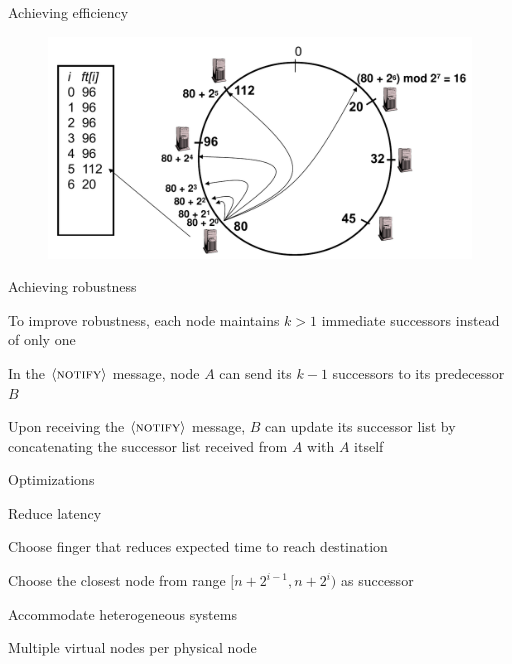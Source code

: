 \begin{frame}{Achieving efficiency}
	
\begin{figure}
	\includegraphics[width=\textwidth]{fingers}
\end{figure}	
	
\end{frame}

\begin{frame}{Achieving robustness}
	
\BI
\item To improve robustness, each node maintains $k > 1$ immediate successors instead of only one
\item In the $\langle \textsc{notify} \rangle$ message, node $A$ can send its $k-1$ successors to its predecessor $B$
\item Upon receiving the $\langle \textsc{notify} \rangle$ message, $B$ can update its successor list 
by concatenating the successor list received from $A$ with $A$ itself
\EI
\end{frame}

\begin{frame}{Optimizations}
	
\BIL
\item \alert{Reduce latency}
	\BI
	\item Choose finger that reduces expected time to reach destination
	\item Choose the closest node from range $[n+2^{i-1},n+2^i)$ as successor
	\EI
\item \alert{Accommodate heterogeneous systems}
	\BI
	\item Multiple virtual nodes per physical node
	\EI
\EIL

\end{frame}

